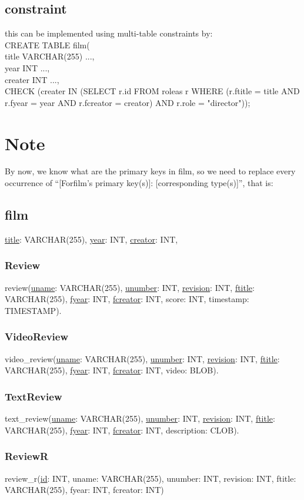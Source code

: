 \documentclass[11pt,fleqn]{exam}
\begin{document}
\subsection*{constraint}
this can be implemented using multi-table constraints by:\\
CREATE TABLE film(\\
title VARCHAR(255) ...,\\
year INT ...,\\
creater INT ..., \\
CHECK (creater IN (SELECT r.id FROM roleas r WHERE (r.ftitle = title AND r.fyear = year AND r.fcreator = creator) AND r.role = "director"));

\section*{Note}
By now, we know what are the primary keys in film, so we need to replace every occurrence of ``[Forfilm's primary key(s)]: [corresponding type(s)]'', that is:


\subsection*{film}
\underline{title}: VARCHAR(255), \underline{year}: INT, \underline{creator}: INT, 


\subsubsection*{Review}
review(\underline{uname}: VARCHAR(255), \underline{unumber}: INT,  \underline{revision}: INT, \underline{ftitle}: VARCHAR(255), \underline{fyear}: INT, \underline{fcreator}: INT, score: INT, timestamp: TIMESTAMP).
\subsubsection*{VideoReview}
video\_review(\underline{uname}: VARCHAR(255), \underline{unumber}: INT,  \underline{revision}: INT, \underline{ftitle}: VARCHAR(255), \underline{fyear}: INT, \underline{fcreator}: INT,  video: BLOB).
\subsubsection*{TextReview}
text\_review(\underline{uname}: VARCHAR(255), \underline{unumber}: INT,  \underline{revision}: INT, \underline{ftitle}: VARCHAR(255), \underline{fyear}: INT, \underline{fcreator}: INT,  description: CLOB).
\subsubsection*{ReviewR}
review\_r(\underline{id}: INT,  uname: VARCHAR(255), unumber: INT, revision: INT, ftitle: VARCHAR(255), fyear: INT, fcreator: INT)








		
	
	
\end{document}
